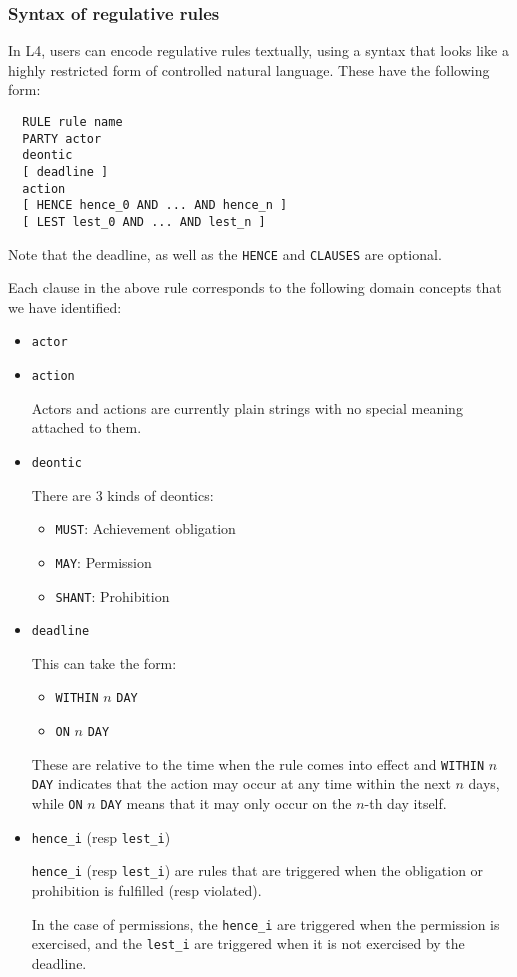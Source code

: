 \documentclass{article}
\begin{document}
\subsubsection{Syntax of regulative rules}
In L4, users can encode regulative rules textually, using a syntax that looks
like a highly restricted form of controlled natural language.
These have the following form:
\begin{lstlisting}
  RULE rule name
  PARTY actor
  deontic
  [ deadline ]
  action
  [ HENCE hence_0 AND ... AND hence_n ]
  [ LEST lest_0 AND ... AND lest_n ]
\end{lstlisting}

Note that the deadline, as well as the \texttt{HENCE} and \texttt{CLAUSES} are
optional.

Each clause in the above rule corresponds to the following
domain concepts that we have identified:
\begin{itemize}
  \item \texttt{actor}
  \item \texttt{action}

  Actors and actions are currently plain strings with no special meaning
  attached to them.
  
  \item \texttt{deontic}

  There are 3 kinds of deontics:
  \begin{itemize}
    \item \texttt{MUST}: Achievement obligation
    \item \texttt{MAY}: Permission
    \item \texttt{SHANT}: Prohibition
  \end{itemize}

  \item \texttt{deadline}

  This can take the form:
  \begin{itemize}
    \item \texttt{WITHIN} $n$ \texttt{DAY}
    \item \texttt{ON} $n$ \texttt{DAY}
  \end{itemize}

  These are relative to the time when the rule comes into effect and
  \texttt{WITHIN} $n$ \texttt{DAY} indicates that the action may occur at any
  time within the next $n$ days, while \texttt{ON} $n$ \texttt{DAY} means that it
  may only occur on the $n$-th day itself.

  \item \texttt{hence\_i} (resp \texttt{lest\_i})

  \texttt{hence\_i} (resp \texttt{lest\_i}) are rules that are triggered
  when the obligation or prohibition is fulfilled (resp violated).

  In the case of permissions, the \texttt{hence\_i} are triggered when the
  permission is exercised, and the \texttt{lest\_i} are triggered when it
  is not exercised by the deadline. 
\end{itemize}
\end{document}
